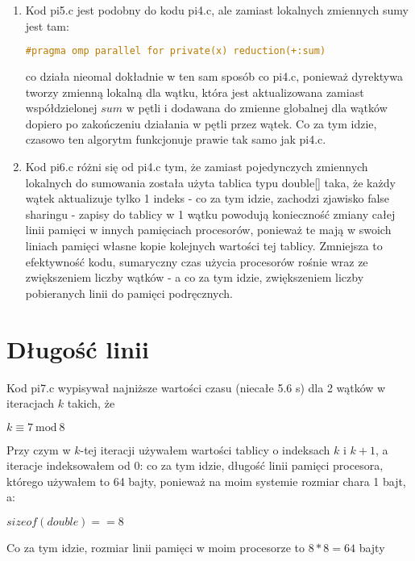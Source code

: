 \documentclass[12pt]{article}
\begin{document}
\begin{enumerate}
	\item Kod pi5.c jest podobny do kodu pi4.c, ale zamiast lokalnych zmiennych sumy jest tam:
	\begin{lstlisting}[language=C]
	#pragma omp parallel for private(x) reduction(+:sum)
	\end{lstlisting}
	co działa nieomal dokładnie w ten sam sposób co pi4.c, ponieważ dyrektywa tworzy zmienną lokalną dla wątku, która jest aktualizowana zamiast współdzielonej $sum$ w pętli i dodawana do zmienne globalnej dla wątków dopiero po zakończeniu działania w pętli przez wątek. Co za tym idzie, czasowo ten algorytm funkcjonuje prawie tak samo jak pi4.c.\\
	
	\item Kod pi6.c różni się od pi4.c tym, że zamiast pojedynczych zmiennych lokalnych do sumowania została użyta tablica typu double[] taka, że każdy wątek aktualizuje tylko 1 indeks - co za tym idzie, zachodzi zjawisko false sharingu - zapisy do tablicy w 1 wątku powodują konieczność zmiany całej linii pamięci w innych pamięciach procesorów, ponieważ te mają w swoich liniach pamięci własne kopie kolejnych wartości tej tablicy. Zmniejsza to efektywność kodu, sumaryczny czas użycia procesorów rośnie wraz ze zwiększeniem liczby wątków - a co za tym idzie, zwiększeniem liczby pobieranych linii do pamięci podręcznych.\\
	
\end{enumerate}
	 
\section{Długość linii}
Kod pi7.c wypisywał najniższe wartości czasu (niecałe 5.6 s) dla 2 wątków w iteracjach $k$ takich, że\\ 
\begin{center}
	$k\equiv7\ \textrm{mod}\ 8$
\end{center}
Przy czym w $k$-tej iteracji używałem wartości tablicy o indeksach $k$ i $k+1$, a iteracje indeksowałem od 0: co za tym idzie, długość linii pamięci procesora, którego używałem to 64 bajty, ponieważ na moim systemie rozmiar chara 1 bajt, a:
\begin{center}
	$sizeof(double)==8$
\end{center}
Co za tym idzie, rozmiar linii pamięci w moim procesorze to $8*8=64$ bajty
\end{document}
